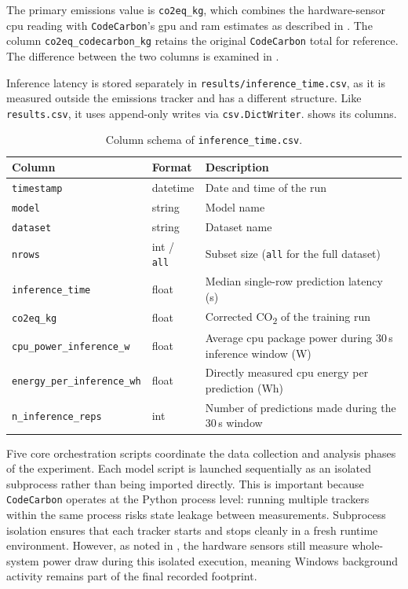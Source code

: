 The primary emissions value is \texttt{co2eq\_kg}, which combines the hardware-sensor \gls{cpu} reading with \texttt{CodeCarbon}'s \gls{gpu} and \gls{ram} estimates as described in . The column \texttt{co2eq\_codecarbon\_kg} retains the original \texttt{CodeCarbon} total for reference. The difference between the two columns is examined in .

Inference latency is stored separately in \texttt{results/inference\_time.csv}, as it is measured outside the emissions tracker and has a different structure. Like \texttt{results.csv}, it uses append-only writes via \texttt{csv.DictWriter}.  shows its columns.

\begin{table}[htbp]
\centering
\small
\caption{Column schema of \texttt{inference\_time.csv}.}
\label{tab:inference_schema}
\begin{tabularx}{\linewidth}{@{} l l X @{}}
\toprule
\textbf{Column} & \textbf{Format} & \textbf{Description} \\
\midrule
\texttt{timestamp}              & datetime           & Date and time of the run \\
\texttt{model}                  & string             & Model name \\
\texttt{dataset}                & string             & Dataset name \\
\texttt{nrows}                  & int / \texttt{all} & Subset size (\texttt{all} for the full dataset) \\
\texttt{inference\_time}           & float              & Median single-row prediction latency (s) \\
\texttt{co2eq\_kg}                 & float              & Corrected CO\textsubscript{2} of the training run \\
\texttt{cpu\_power\_inference\_w}  & float              & Average \gls{cpu} package power during 30\,s inference window (W) \\
\texttt{energy\_per\_inference\_wh} & float             & Directly measured \gls{cpu} energy per prediction (Wh) \\
\texttt{n\_inference\_reps}        & int                & Number of predictions made during the 30\,s window \\
\bottomrule
\end{tabularx}
\end{table}

Five core orchestration scripts coordinate the data collection and analysis phases of the experiment.
Each model script is launched sequentially as an isolated subprocess rather than being imported directly. This is important because \texttt{CodeCarbon} operates at the Python process level: running multiple trackers within the same process risks state leakage between measurements. Subprocess isolation ensures that each tracker starts and stops cleanly in a fresh runtime environment. However, as noted in , the hardware sensors still measure whole-system power draw during this isolated execution, meaning Windows background activity remains part of the final recorded footprint.

